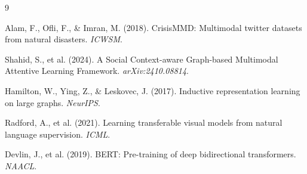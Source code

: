 \documentclass[12pt,a4paper]{article}
\begin{document}
\begin{thebibliography}{9}

Alam, F., Ofli, F., \& Imran, M. (2018).
CrisisMMD: Multimodal twitter datasets from natural disasters.
\textit{ICWSM}.

Shahid, S., et al. (2024).
A Social Context-aware Graph-based Multimodal Attentive Learning Framework.
\textit{arXiv:2410.08814}.

Hamilton, W., Ying, Z., \& Leskovec, J. (2017).
Inductive representation learning on large graphs.
\textit{NeurIPS}.

Radford, A., et al. (2021).
Learning transferable visual models from natural language supervision.
\textit{ICML}.

Devlin, J., et al. (2019).
BERT: Pre-training of deep bidirectional transformers.
\textit{NAACL}.

\end{thebibliography}
\end{document}
